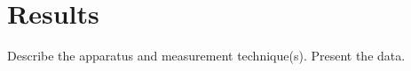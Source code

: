\section{Results}\label{sec:results}
Describe the apparatus and measurement technique(s).
Present the data.
